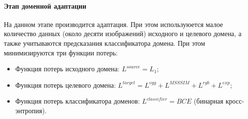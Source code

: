 \paragraph{Этап доменной адаптации}

На данном этапе производится адаптация. При этом используюется малое количество данных (около десяти изображений) исходного и целевого домена, а также учитываются предсказания классификатора домена. При этом минимизируются три функции потерь:
\begin{itemize}
    \item Функция потерь исходного домена: $L^{source}=L_1$;
    \item Функция потерь целевого домена: $L^{target}=L^{vgg} + L^{MSSSIM} + L^{rgb} + L^{exp}$;
    \item Функция потерь классификатора доменов: $L^{classifier}=BCE$ (бинарная кросс-энтропия).
\end{itemize}
